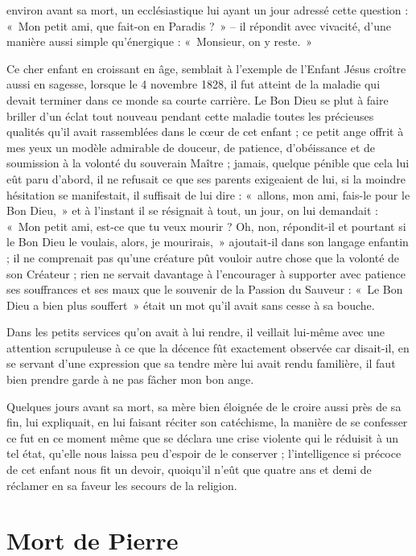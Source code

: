 \documentclass[11pt,a4paper]{report}
\begin{document}
environ avant sa mort, un ecclésiastique lui ayant un jour adressé cette question : «~Mon petit ami, que fait-on en Paradis ?~» -- il répondit avec vivacité, d'une manière aussi simple qu'énergique : «~Monsieur, on y reste.~»

Ce cher enfant en croissant en âge, semblait à l'exemple de l'Enfant Jésus croître aussi en sagesse, lorsque le 4 novembre 1828, il fut atteint de la maladie qui devait terminer dans ce monde sa courte carrière. Le Bon Dieu se plut à faire briller d'un éclat tout nouveau pendant cette maladie toutes les précieuses qualités qu'il avait rassemblées dans le cœur de cet enfant ; ce petit ange offrit à mes yeux un modèle admirable de douceur, de patience, d'obéissance et de soumission à la volonté du souverain Maître ; jamais, quelque pénible que cela lui eût paru d'abord, il ne refusait ce que ses parents exigeaient de lui, si la moindre hésitation se manifestait, il suffisait de lui dire : «~allons, mon ami, fais-le pour le Bon Dieu,~» et à l'instant il se résignait à tout, un jour, on lui demandait : «~Mon petit ami, est-ce que tu veux mourir ? Oh, non, répondit-il et pourtant si le Bon Dieu le voulais, alors, je mourirais,~» ajoutait-il dans son langage enfantin ; il ne comprenait pas qu'une créature pût vouloir autre chose que la volonté de son Créateur ; rien ne servait davantage à l'encourager à supporter avec patience ses souffrances et ses maux que le souvenir de la Passion du Sauveur : «~Le Bon Dieu a bien plus souffert~» était un mot qu'il avait sans cesse à sa bouche.

Dans les petits services qu'on avait à lui rendre, il veillait lui-même avec une attention scrupuleuse à ce que la décence fût exactement observée car disait-il, en se servant d'une expression que sa tendre mère lui avait rendu familière, il faut bien prendre garde à ne pas fâcher mon bon ange.

Quelques jours avant sa mort, sa mère bien éloignée de le croire aussi près de sa fin, lui expliquait, en lui faisant réciter son catéchisme, la manière de se confesser ce fut en ce moment même que se déclara une crise violente qui le réduisit à un tel état, qu'elle nous laissa peu d'espoir de le conserver ; l'intelligence si précoce de cet enfant nous fit un devoir, quoiqu'il n'eût que quatre ans et demi de réclamer en sa faveur les secours de la religion.

\section*{Mort de Pierre}
\end{document}
